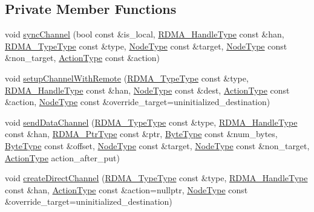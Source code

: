 \subsection*{Private Member Functions}
\begin{DoxyCompactItemize}
\item 
void \hyperlink{structvt_1_1rdma_1_1_r_d_m_a_manager_a4dd6beec7e4e1d3cc4c0ad3e8d0e7837}{sync\+Channel} (bool const \&is\+\_\+local, \hyperlink{namespacevt_a10442579ec4e7ebef223818e64bcf908}{R\+D\+M\+A\+\_\+\+Handle\+Type} const \&han, \hyperlink{namespacevt_1_1rdma_ac848e1d9da43db6294bd06f83e5d3946}{R\+D\+M\+A\+\_\+\+Type\+Type} const \&type, \hyperlink{namespacevt_a866da9d0efc19c0a1ce79e9e492f47e2}{Node\+Type} const \&target, \hyperlink{namespacevt_a866da9d0efc19c0a1ce79e9e492f47e2}{Node\+Type} const \&non\+\_\+target, \hyperlink{namespacevt_ae0a5a7b18cc99d7b732cb4d44f46b0f3}{Action\+Type} const \&action)
\item 
void \hyperlink{structvt_1_1rdma_1_1_r_d_m_a_manager_abd4b573102bf0a4c7dd0687d257f7a0d}{setup\+Channel\+With\+Remote} (\hyperlink{namespacevt_1_1rdma_ac848e1d9da43db6294bd06f83e5d3946}{R\+D\+M\+A\+\_\+\+Type\+Type} const \&type, \hyperlink{namespacevt_a10442579ec4e7ebef223818e64bcf908}{R\+D\+M\+A\+\_\+\+Handle\+Type} const \&han, \hyperlink{namespacevt_a866da9d0efc19c0a1ce79e9e492f47e2}{Node\+Type} const \&dest, \hyperlink{namespacevt_ae0a5a7b18cc99d7b732cb4d44f46b0f3}{Action\+Type} const \&action, \hyperlink{namespacevt_a866da9d0efc19c0a1ce79e9e492f47e2}{Node\+Type} const \&override\+\_\+target=uninitialized\+\_\+destination)
\item 
void \hyperlink{structvt_1_1rdma_1_1_r_d_m_a_manager_acef2971a0d793bc8462beac8ef03ef51}{send\+Data\+Channel} (\hyperlink{namespacevt_1_1rdma_ac848e1d9da43db6294bd06f83e5d3946}{R\+D\+M\+A\+\_\+\+Type\+Type} const \&type, \hyperlink{namespacevt_a10442579ec4e7ebef223818e64bcf908}{R\+D\+M\+A\+\_\+\+Handle\+Type} const \&han, \hyperlink{namespacevt_aab05b4a584f7ee835a6d0f66915cf59b}{R\+D\+M\+A\+\_\+\+Ptr\+Type} const \&ptr, \hyperlink{namespacevt_aab8d55968084610ce3b17057981e9300}{Byte\+Type} const \&num\+\_\+bytes, \hyperlink{namespacevt_aab8d55968084610ce3b17057981e9300}{Byte\+Type} const \&offset, \hyperlink{namespacevt_a866da9d0efc19c0a1ce79e9e492f47e2}{Node\+Type} const \&target, \hyperlink{namespacevt_a866da9d0efc19c0a1ce79e9e492f47e2}{Node\+Type} const \&non\+\_\+target, \hyperlink{namespacevt_ae0a5a7b18cc99d7b732cb4d44f46b0f3}{Action\+Type} action\+\_\+after\+\_\+put)
\item 
void \hyperlink{structvt_1_1rdma_1_1_r_d_m_a_manager_a0007e2a8fba26477bd9bb52887e855e3}{create\+Direct\+Channel} (\hyperlink{namespacevt_1_1rdma_ac848e1d9da43db6294bd06f83e5d3946}{R\+D\+M\+A\+\_\+\+Type\+Type} const \&type, \hyperlink{namespacevt_a10442579ec4e7ebef223818e64bcf908}{R\+D\+M\+A\+\_\+\+Handle\+Type} const \&han, \hyperlink{namespacevt_ae0a5a7b18cc99d7b732cb4d44f46b0f3}{Action\+Type} const \&action=nullptr, \hyperlink{namespacevt_a866da9d0efc19c0a1ce79e9e492f47e2}{Node\+Type} const \&override\+\_\+target=uninitialized\+\_\+destination)

\end{DoxyCompactItemize}
